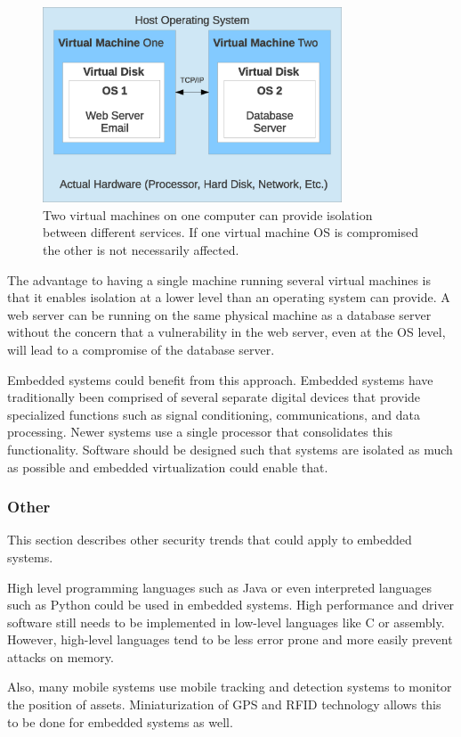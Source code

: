 \documentclass[final,conference,11pt]{IEEEtran}
\begin{document}
\begin{figure}[!t]
\centering
\includegraphics[width=3.5in]{virtual}
\caption{Two virtual machines on one computer can provide isolation between different services.  If one virtual machine OS is compromised the other is not necessarily affected.}
\label{fig:virtual}
\end{figure}

The advantage to having a single machine running several virtual machines is that it enables isolation at a lower level than an operating system can provide.  A web server can be running on the same physical machine as a database server without the concern that a vulnerability in the web server, even at the OS level, will lead to a compromise of the database server. \cite{June2011}

Embedded systems could benefit from this approach.  Embedded systems have traditionally been comprised of several separate digital devices that provide specialized functions such as signal conditioning, communications, and data processing.  Newer systems use a single processor that consolidates this functionality.  Software should be designed such that systems are isolated as much as possible and embedded virtualization could enable that.  

\subsubsection{Other}
This section describes other security trends that could apply to embedded systems.  

High level programming languages such as Java or even interpreted languages such as Python could be used in embedded systems.  High performance and driver software still needs to be implemented in low-level languages like C or assembly. However, high-level languages tend to be less error prone and more easily prevent attacks on memory.  

Also, many mobile systems use mobile tracking and detection systems to monitor the position of assets.  Miniaturization of GPS and RFID technology allows this to be done for embedded systems as well. \cite{1105.006620110430,edselc.2-52.0-6734912187720090101}
\end{document}
